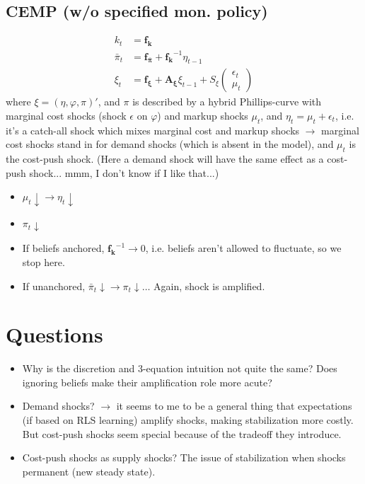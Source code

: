 \documentclass[11pt]{article}
\renewcommand{\[}{\begin{equation}}
\renewcommand{\]}{\end{equation}}
\begin{document}
	
\subsection{CEMP (w/o specified mon. policy)}
\begin{align}
k_t & = \mathbf{f_k} \\
\bar{\pi}_t &=\mathbf{f_{\bar{\pi}}} + \mathbf{f_k}^{-1}\eta_{t-1}\\
\xi_t & = \mathbf{f_{\xi}} + \mathbf{A_{\xi}} \xi_{t-1} + S_{\xi} \begin{pmatrix} \epsilon_t \\ \mu_t \end{pmatrix} 
\end{align}
where $\xi = (\eta, \varphi, \pi)'$, and $\pi$ is described by a hybrid Phillips-curve with marginal cost shocks (shock $\epsilon$ on $\varphi$) and markup shocks $\mu_t$, and $\eta_t = \mu_t + \epsilon_t$, i.e. it's a catch-all shock which mixes marginal cost and markup shocks $\rightarrow$ marginal cost shocks stand in for demand shocks (which is absent in the model), and $\mu_t$ is the cost-push shock. (Here a demand shock will have the same effect as a cost-push shock... mmm, I don't know if I like that...)
\begin{itemize}
\item $\mu_t \downarrow \rightarrow \eta_t \downarrow$
\item $\pi_t \downarrow$
\item If beliefs anchored, $\mathbf{f_k}^{-1} \rightarrow 0$, i.e. beliefs aren't allowed to fluctuate, so we stop here.
\item If unanchored, $\bar{\pi}_t \downarrow \rightarrow \pi_t \downarrow \dots$ Again, shock is amplified. 
\end{itemize}

\section{Questions}
\begin{itemize}
\item Why is the discretion and 3-equation intuition not quite the same? Does ignoring beliefs make their amplification role more acute?
\item Demand shocks? $\rightarrow$ it seems to me to be a general thing that expectations (if based on RLS learning) amplify shocks, making stabilization more costly. But cost-push shocks seem special because of the tradeoff they introduce. 
\item Cost-push shocks as supply shocks? The issue of stabilization when shocks permanent (new steady state).
\end{itemize}




 
\end{document}
